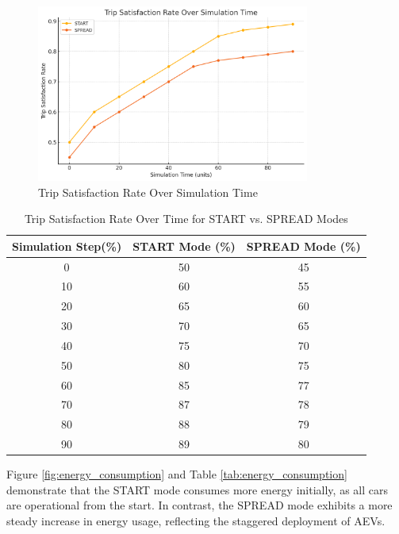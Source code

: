 \begin{figure}[h!]
    \centering
    \includegraphics[width=0.8\textwidth]{Crest/Images/satisfaction_rate.png}
    \caption{Trip Satisfaction Rate Over Simulation Time}
    \label{fig:satisfaction_rate}
\end{figure}

\begin{table}[h!]
\centering
\begin{tabular}{|c|c|c|}
\hline
\textbf{Simulation Step(\%)} & \textbf{START Mode (\%)} & \textbf{SPREAD Mode (\%)} \\ \hline
0  & 50 & 45 \\ 
10 & 60 & 55 \\ 
20 & 65 & 60 \\ 
30 & 70 & 65 \\ 
40 & 75 & 70 \\ 
50 & 80 & 75 \\ 
60 & 85 & 77 \\ 
70 & 87 & 78 \\ 
80 & 88 & 79 \\ 
90 & 89 & 80 \\ \hline
\end{tabular}
\caption{Trip Satisfaction Rate Over Time for START vs. SPREAD Modes}
\label{tab:satisfaction_rate}
\end{table}

Figure \ref{fig:energy_consumption} and Table \ref{tab:energy_consumption} demonstrate that the START mode consumes more energy initially, as all cars are operational from the start. In contrast, the SPREAD mode exhibits a more steady increase in energy usage, reflecting the staggered deployment of AEVs.

